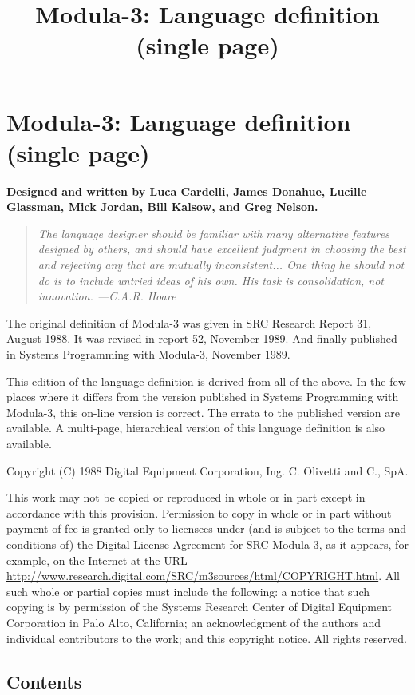 \documentclass[10pt]{article}
\title{Modula-3: Language definition (single page)}
\begin{document}
\section*{Modula-3: Language definition (single page)}


 \textbf{Designed and written by Luca Cardelli, James Donahue, Lucille Glassman, Mick Jordan, Bill Kalsow, and Greg Nelson.}



 
\begin{quote}
\emph{ The language designer should be familiar with many alternative features designed by others, and should have excellent judgment in choosing the best and rejecting any that are mutually inconsistent... One thing he should not do is to include untried ideas of his own. His task is consolidation, not innovation. ---C.A.R. Hoare }
\end{quote}



  The original definition of Modula-3 was given in SRC Research Report 31, August 1988. It was revised in report 52, November 1989. And finally published in Systems Programming with Modula-3, November 1989. 


  This edition of the language definition is derived from all of the above. In the few places where it differs from the version published in Systems Programming with Modula-3, this on-line version is correct. The errata to the published version are available. A multi-page, hierarchical version of this language definition is also available. 


  Copyright (C) 1988 Digital Equipment Corporation, Ing. C. Olivetti and C., SpA. 


  This work may not be copied or reproduced in whole or in part except in accordance with this provision. Permission to copy in whole or in part without payment of fee is granted only to licensees under (and is subject to the terms and conditions of) the Digital License Agreement for SRC Modula-3, as it appears, for example, on the Internet at the URL \url{http://www.research.digital.com/SRC/m3sources/html/COPYRIGHT.html}. All such whole or partial copies must include the following: a notice that such copying is by permission of the Systems Research Center of Digital Equipment Corporation in Palo Alto, California; an acknowledgment of the authors and individual contributors to the work; and this copyright notice. All rights reserved. 
\subsection*{Contents}
\end{document}
